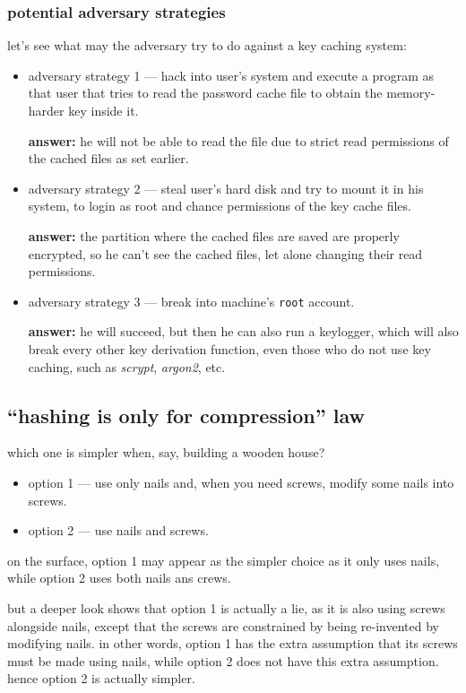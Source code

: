 \documentclass[twocolumn]{article}
\begin{document}
\subsubsection{potential adversary strategies}
let's see what may the adversary try to do against a key caching system:
\begin{itemize}
    \item adversary strategy 1 --- hack into user's system and execute a
    program as that user that tries to read the password cache file to
    obtain the memory-harder key inside it.

    \textbf{answer:} he will not be able to read the file due to strict
    read permissions of the cached files as set earlier.

    \item adversary strategy 2 --- steal user's hard disk and try to mount
    it in his system, to login as root and chance permissions of the key
    cache files.

    \textbf{answer:} the partition where the cached files are saved are
    properly encrypted, so he can't see the cached files, let alone
    changing their read permissions.

    \item adversary strategy 3 --- break into machine's \texttt{root}
    account.

    \textbf{answer:} he will succeed, but then he can also run a keylogger,
    which will also break every other key derivation function, even those
    who do not use key caching, such as \emph{scrypt}, \emph{argon2}, etc.
\end{itemize}

\subsection{``hashing is only for compression'' law}
which one is simpler when, say, building a wooden house?
\begin{itemize}
    \item option 1 --- use only nails and, when you need screws,
    modify some nails into screws.
    \item option 2 --- use nails and screws.
\end{itemize}

on the surface, option 1 may appear as the simpler choice as it only uses
nails, while option 2 uses both nails ans crews.

but a deeper look shows that option 1 is actually a lie, as it is also
using screws alongside nails, except that the screws are constrained by
being re-invented by modifying nails.  in other words, option 1 has the
extra assumption that its screws must be made using nails, while option 2
does not have this extra assumption.  hence option 2 is actually simpler.
\end{document}
